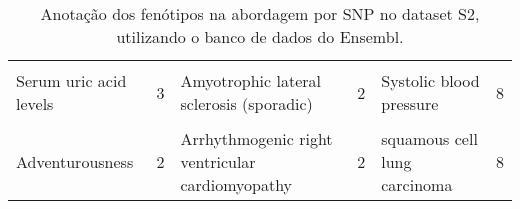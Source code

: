 \begin{landscape}
\begin{table}[!hp]
{\begin{tabular}[hp]{lrlrlr}
\cellcolor{gray!6}{Myocardial infarction} & \cellcolor{gray!6}{3} & \cellcolor{gray!6}{Alcohol consumption (max-drinks)} & \cellcolor{gray!6}{2} & \cellcolor{gray!6}{Small cell lung carcinoma} & \cellcolor{gray!6}{8}\\
Serum uric acid levels & 3 & Amyotrophic lateral sclerosis (sporadic) & 2 & Systolic blood pressure & 8\\
\cellcolor{gray!6}{Systolic blood pressure} & \cellcolor{gray!6}{3} & \cellcolor{gray!6}{Apolipoprotein B levels} & \cellcolor{gray!6}{2} & \cellcolor{gray!6}{Triglycerides} & \cellcolor{gray!6}{8}\\
Adventurousness & 2 & Arrhythmogenic right ventricular cardiomyopathy & 2 & squamous cell lung carcinoma & 8\\
\bottomrule

\end{tabular}}

\caption{Anotação dos fenótipos na abordagem por SNP no dataset S2, utilizando o banco de dados do Ensembl.}
\label{tab:ds2_ensembl_persnp}

\end{table}
\end{landscape}